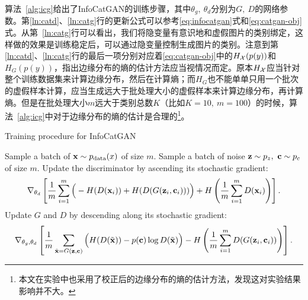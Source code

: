 算法~\ref{alg:icg}给出了InfoCatGAN的训练步骤，其中$\theta_g,~\theta_d$分别为$G, ~D$的网络参数。第\ref{ln:catd}、\ref{ln:catg}行的更新公式可以参考\eqref{eq:infocatgan}式和\eqref{eq:catgan-obj}式。从第~\ref{ln:catg}行可以看出，我们将隐变量有意识地和虚假图片的类别绑定，这样做的效果是训练稳定后，可以通过隐变量控制生成图片的类别。注意到第\ref{ln:catd}、\ref{ln:catg}行的最后一项分别对应着\eqref{eq:catgan-obj}中的$H_{\mathcal{X}}(p(y))$和$H_{G}(p(y))$，\citet{springenberg2015unsupervised}指出边缘分布的熵的估计方法应当视情况而定。原本$H_{\mathcal{X}}$应当针对整个训练数据集来计算边缘分布，然后在计算熵；而$H_G$也不能单单只用一个批次的虚假样本计算，应当生成远大于批处理大小的虚假样本来计算边缘分布，再计算熵。但是在批处理大小$m$远大于类别总数$K$（比如$K=10, ~m=100$）的时候，算法~\ref{alg:icg}中对于边缘分布的熵的估计是合理的\footnote{本文在实验中也采用了校正后的边缘分布的熵的估计方法，发现这对实验结果影响并不大。}。
\begin{algorithm}[htbp]
  \small
  \caption{Training procedure for InfoCatGAN}
  \label{alg:icg}
  \begin{algorithmic}[1]
      \State Sample a batch of $\mathbf{x} \sim p_{\text{data}}(x)$ of size $m$.
      \State Sample a batch of noise $\mathbf{z}\sim p_z, ~\mathbf{c}\sim p_c$ of size
      $m$.
      \State Update the discriminator by ascending its stochastic gradient:
      \label{ln:catd}
      \[
        \nabla_{\theta_d} \left[ 
          \frac{1}{m} \sum_{i=1}^m \Big( 
            - H(D(\mathbf{x}_i)) + H(D(G(\mathbf{z}_i, \mathbf{c}_i)))
          \Big) + H\left( \frac{1}{m}\sum_{i=1}^m D(\mathbf{x}_i) \right)
        \right].
      \]
      \State Update $G$ and $D$ by descending along its stochastic gradient:
      \label{ln:catg}
      \[
        \nabla_{\theta_g,\theta_d} \left[ 
          \frac{1}{m} \sum_{\tilde{\mathbf{x}} = G(\mathbf{z},\mathbf{c})} \Big(
            H(D(\tilde{\mathbf{x}})) - p(\mathbf{c})\log D(\tilde{\mathbf{x}})
          \Big)
          - H \left( 
            \frac{1}{m}\sum_{i=1}^m D(G(\mathbf{z}_i, \mathbf{c}_i))
          \right)
        \right].
      \]
    \EndFor
  \end{algorithmic}
\end{algorithm}


